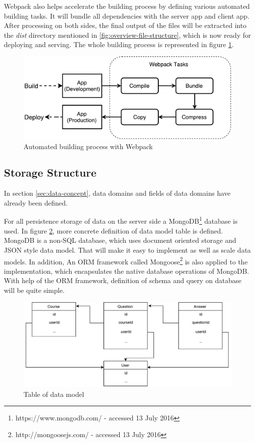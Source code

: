 Webpack also helps accelerate the building process by defining various automated building tasks. It will bundle all dependencies with the server app and client app. After processing on both sides, the final output of the files will be extracted into the \textit{dist} directory mentioned in \ref{fig:overview-file-structure}, which is now ready for deploying and serving. The whole building process is represented in figure \ref{fig:automated-building-imp}.

\begin{figure}[!htbp]
  \centering
    \includegraphics[width=1\textwidth]{Figures/imp-automated-building.pdf}
  \caption{Automated building process with Webpack}
  \label{fig:automated-building-imp}
\end{figure}

\subsection{Storage Structure} \label{subsec:storage-structure-imp}
In section \ref{sec:data-concept}, data domains and fields of data domains  have already been defined. 

For all persistence storage of data on the server side a MongoDB\footnote{https://www.mongodb.com/ - accessed 13 July 2016} database is used.  In figure \ref{fig:data-model-table-imp}, more concrete definition of data model table is defined. MongoDB is a non-SQL database, which uses document oriented storage and JSON style data model. That will make it easy to implement as well as scale data models. In addition, An \gls{ORM} framework called Mongoose\footnote{http://mongoosejs.com/ - accessed 13 July 2016} is also applied to the implementation, which encapsulates the native database operations of MongoDB. With help of the \gls{ORM} framework, definition of schema and query on database will be quite simple. 


\begin{figure}[!htbp]
  \centering
    \includegraphics[width=1\textwidth]{Figures/concept-data-domain-relation.pdf}
  \caption{Table of data model}
  \label{fig:data-model-table-imp}
\end{figure}
